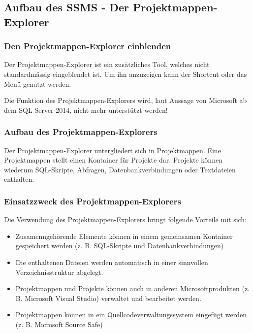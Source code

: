       \subsection{Aufbau des SSMS - Der Projektmappen-Explorer}
        \subsubsection{Den Projektmappen-Explorer einblenden}
          Der Projektmappen-Explorer ist ein zusätzliches Tool, welches nicht
          standardmässig eingeblendet ist. Um ihn anzuzeigen kann der Shortcut
           oder das Menü  genutzt
          werden.
          \begin{merke}
            Die Funktion des Projektmappen-Explorers wird, laut Aussage von
            Microsoft ab dem SQL Server 2014, nicht mehr unterstützt werden!
          \end{merke}
        \subsubsection{Aufbau des Projektmappen-Explorers}
          Der Projektmappen-Explorer untergliedert sich in Projektmappen. Eine
          Projektmappen stellt einen Kontainer für Projekte dar.
          Projekte können wiederum SQL-Skripte, Abfragen, Datenbankverbindungen
          oder Textdateien enthalten.
        \subsubsection{Einsatzzweck des Projektmappen-Explorers}
          Die Verwendung des Projektmappen-Explorers bringt folgende Vorteile
          mit sich:
          \begin{itemize}
            \item Zusamenngehörende Elemente können in einem gemeinsamen
            Kontainer gespeichert werden (z. B. SQL-Skripte und
            Datenbankverbindungen)
            \item Die enthaltenen Dateien werden automatisch in einer sinnvollen
            Verzeichnisstruktur abgelegt.
            \item Projektmappen und Projekte können auch in anderen
            Microsoftprodukten (z. B. Microsoft Visual Studio) verwaltet und
            bearbeitet werden.
            \item Projektmappen können in ein Quellcodeverwaltungssystem
            eingefügt werden (z. B. Microsoft Source Safe)
          \end{itemize}
